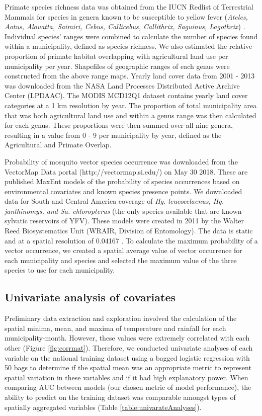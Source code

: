 \documentclass{article}
\begin{document}
Primate species richness data was obtained from the IUCN Redlist of Terrestrial Mammals for species in genera known to be susceptible to yellow fever (\textit{Ateles, Aotus, Alouatta, Saimiri, Cebus, Callicebus, Callithrix, Saguinus, Lagothrix}) \cite{bicca-marques2010,hamrick2017}. Individual species' ranges were combined to calculate the number of species found within a municipality, defined as species richness. We also estimated the relative proportion of primate habitat overlapping with agricultural land use per municipality per year. Shapefiles of geographic ranges of each genus were constructed from the above range maps. Yearly land cover data from 2001 - 2013 was downloaded from the NASA Land Processes Distributed Active Archive Center (LPDAAC). The MODIS MCD12Q1 dataset contains yearly land cover categories at a 1 km resolution by year. The proportion of total municipality area that was both agricultural land use and within a genus range was then calculated for each genus.  These proportions were then summed over all nine genera, resulting in a value from 0 - 9 per municipality by year, defined as the Agricultural and Primate Overlap.

Probability of mosquito vector species occurrence was downloaded from the VectorMap Data portal (http://vectormap.si.edu/) on May 30 2018. These are published MaxEnt models of the probability of species occurrences based on environmental covariates and known species presence points. We downloaded data for South and Central America coverage of \textit{Hg. leucocelaenus, Hg. janthinomys, and Sa. chloropterus} (the only species available that are known sylvatic reservoirs of YFV). These models were
created in 2011 by the Walter Reed Biosystematics Unit (WRAIR, Division of Entomology). The data is static and at a spatial resolution of 0.04167 \degree. To calculate the maximum probability of a vector occurrence, we created a spatial average value of vector occurrence for each municipality and species and selected the maximum value of the three species to use for each municipality.

\subsection{Univariate analysis of covariates}

Preliminary data extraction and exploration involved the calculation of the spatial minima, mean, and maxima of temperature and rainfall for each municipality-month.
However, these values were extremely correlated with each other (Figure \ref{fig:corrmat}).
Therefore, we conducted univariate analyses of each variable on the national training dataset using a bagged logistic regression with 50 bags to determine if the spatial mean was an appropriate metric to represent spatial variation in these variables and if it had high explanatory power.
When comparing AUC between models (our chosen metric of model performance), the ability to predict on the training dataset was comparable amongst types of spatially aggregated variables (Table \ref{table:univarateAnalyses}).
\end{document}
